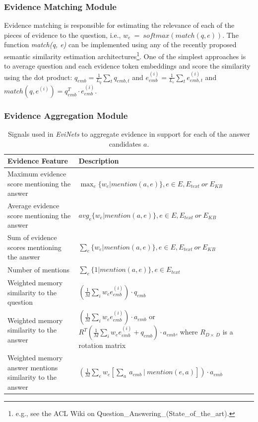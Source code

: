 \subsubsection{Evidence Matching Module}

Evidence matching is responsible for estimating the relevance of each of the pieces of evidence to the question, i.e., $w_e~=~softmax(match(q, e))$.
The function \textit{match(q, e)} can be implemented using any of the recently proposed semantic similarity estimation architectures\footnote{e.g., see the ACL Wiki on Question\_Answering\_(State\_of\_the\_art).}.
One of the simplest approaches is to average question and each evidence token embeddings and score the similarity using the dot product: $q_{emb} = \frac{1}{L_q}\sum_t q_{emb,t}$ and $e^{(i)}_{emb} = \frac{1}{L_e}\sum_t e^{(i)}_{emb,t}$ and $match(q, e^{(i)}) = q^T_{emb} \cdot e^{(i)}_{emb}$.

\subsubsection{Evidence Aggregation Module}

\begin{table}[h!]
\centering
\small
\begin{tabular}{p{5.2cm}|p{7.8cm}}
Evidence Feature & Description \\
\hline
Maximum evidence score mentioning the answer & $\max_e \{w_e | mention(a, e)\}, e\in E,E_{text}~or~E_{KB}$ \\
Average evidence score mentioning the answer & $avg_e \{w_e | mention(a, e)\}, e\in E,E_{text}~or~E_{KB}$ \\
Sum of evidence scores mentioning the answer & $\sum_e \{w_e | mention(a, e)\}, e\in E,E_{text}~or~E_{KB}$ \\
Number of mentions & $\sum_e \{1 | mention(a, e)\}, e\in E_{text}$ \\
Weighted memory similarity to the question & $(\frac{1}{M}\sum_i w_e e^{(i)}_{emb})\cdot q_{emb}$\\
Weighted memory similarity to the answer~\cite{sukhbaatar2015end} & $(\frac{1}{M}\sum_i w_e e^{(i)}_{emb})\cdot a_{emb}$ or $R^T(\frac{1}{M}\sum_i w_e e^{(i)}_{emb} + q_{emb}) \cdot a_{emb}$, where $R_{D\times~D}$ is a rotation matrix \\
Weighted memory answer mentions similarity to the answer~\cite{miller2016key} & $(\frac{1}{M}\sum_e w_e [\sum_a~a_{emb}~|~mention(e, a)]) \cdot a_{emb}$ \\
\end{tabular}
\caption{Signals used in \textit{EviNets} to aggregate evidence in support for each of the answer candidates $a$.}
\label{table:factoid:evinet:aggregation}
\end{table}

